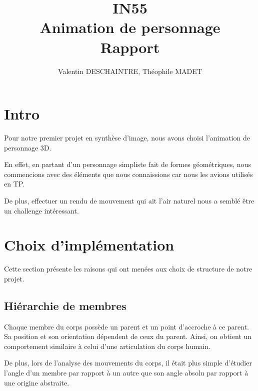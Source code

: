 \documentclass[10pt,a4paper,titlepage]{article}
\author{Valentin DESCHAINTRE, Théophile MADET}
\title{IN55\\Animation de personnage\\Rapport}
\begin{document}
\maketitle
\tableofcontents
\section{Intro}
Pour notre premier projet en synthèse d'image, nous avons choisi l'animation de personnage 3D. 
\par
En effet, en partant d'un personnage simpliste fait de formes géométriques, nous commencions avec des éléments que nous connaissions car nous les avions utilisés en TP. 
\par
De plus, effectuer un rendu de mouvement qui ait l'air naturel nous a semblé être un challenge intéressant. 
\section{Choix d'implémentation}
Cette section présente les raisons qui ont menées aux choix de structure de notre projet.

\subsection{Hiérarchie de membres}
Chaque membre du corps possède un parent et un point d'accroche à ce parent. Sa position et son orientation dépendent de ceux du parent. Ainsi, on obtient un comportement similaire à celui d'une articulation du corps humain. 
\par
De plus, lors de l'analyse des mouvements du corps, il était plus simple d'étudier l'angle d'un membre par rapport à un autre que son angle absolu par rapport à une origine abstraite.  
\end{document}
